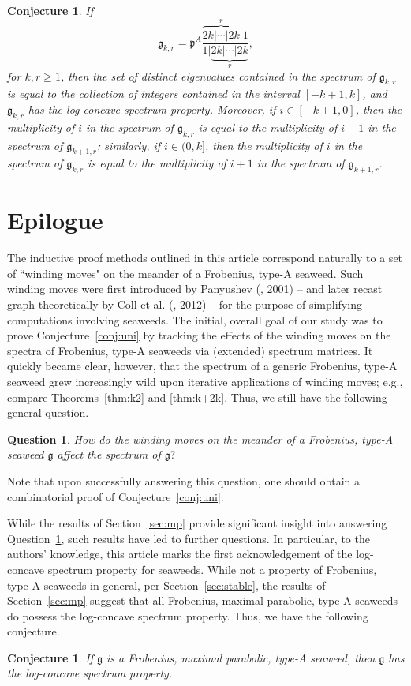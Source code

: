 \documentclass[letterpaper,10pt]{article}
\newtheorem{conj}[theorem]{Conjecture}
\newtheorem{que}[theorem]{Question}
\begin{document}
\begin{conj}\label{conj:stab3}
If $$\mathfrak{g}_{k,r}=\mathfrak{p}^A\frac{\overbrace{2k|\cdots|2k}^r|1}{1|\underbrace{2k|\cdots|2k}_r},$$ for $k,r\ge 1$, then the set of distinct eigenvalues contained in the spectrum of $\mathfrak{g}_{k,r}$ is equal to the collection of integers contained in the interval $[-k+1,k]$, and $\mathfrak{g}_{k,r}$ has the log-concave spectrum property. Moreover, if $i\in[-k+1,0]$, then the multiplicity of $i$ in the spectrum of $\mathfrak{g}_{k,r}$ is equal to the multiplicity of $i-1$ in the spectrum of $\mathfrak{g}_{k+1,r}$; similarly, if $i\in(0,k]$, then the multiplicity of $i$ in the spectrum of $\mathfrak{g}_{k,r}$ is equal to the multiplicity of $i+1$ in the spectrum of $\mathfrak{g}_{k+1,r}$.
\end{conj}

\section{Epilogue}\label{sec:epilogue}
The inductive proof methods outlined in this article correspond naturally to a set of ``winding moves" on the meander of a Frobenius, type-A seaweed. Such winding moves were first introduced by Panyushev (\textbf{\cite{Pan2001}}, 2001) -- and later recast graph-theoretically by Coll et al. (\textbf{\cite{meanders2}}, 2012) -- for the purpose of simplifying computations involving seaweeds. The initial, overall goal of our study was to prove Conjecture~\ref{conj:uni} by tracking the effects of the winding moves on the spectra of Frobenius, type-A seaweeds via (extended) spectrum matrices. It quickly became clear, however, that the spectrum of a generic Frobenius, type-A seaweed grew increasingly wild upon iterative applications of winding moves; e.g., compare Theorems~\ref{thm:k2} and \ref{thm:k+2k}. Thus, we still have the following general question.
\begin{que}\label{que:1}
\textit{How do the winding moves on the meander of a Frobenius, type-A seaweed $\mathfrak{g}$ affect the spectrum of $\mathfrak{g}?$}
\end{que}

\noindent Note that upon successfully answering this question, one should obtain a combinatorial proof of Conjecture~\ref{conj:uni}.

While the results of Section~\ref{sec:mp} provide significant insight into answering Question~\ref{que:1}, such results have led to further questions. In particular, to the authors' knowledge, this article marks the first acknowledgement of the log-concave spectrum property for seaweeds. While not a property of Frobenius, type-A seaweeds in general, per Section~\ref{sec:stable}, the results of Section~\ref{sec:mp} suggest that all Frobenius, maximal parabolic, type-A seaweeds do possess the log-concave spectrum property. Thus, we have the following conjecture.
\begin{conj}
If $\mathfrak{g}$ is a Frobenius, maximal parabolic, type-A seaweed, then $\mathfrak{g}$ has the log-concave spectrum property.
\end{conj}
\end{document}
